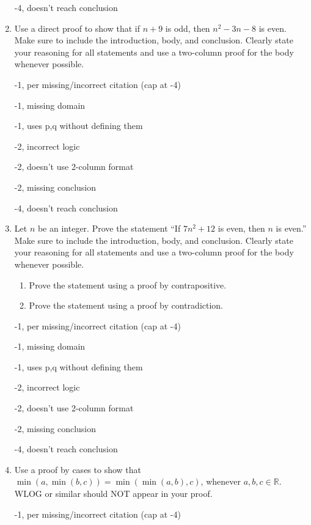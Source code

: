 \begin{enumerate}
\begin{rubric}
-4, doesn't reach conclusion
\end{rubric}

\item Use a direct proof to show that if $n + 9$ is odd, then $n^2-3n-8$ is even. Make sure to include the introduction, body, and conclusion. Clearly state your reasoning for all statements and use a two-column proof for the body whenever possible. 

\begin{rubric}
-1, per missing/incorrect citation (cap at -4)

-1, missing domain

-1, uses p,q without defining them

-2, incorrect logic

-2, doesn't use 2-column format

-2, missing conclusion

-4, doesn't reach conclusion
\end{rubric}

\item Let $n$ be an integer. Prove the statement “If $7n^2 + 12$ is even, then $n$ is even.” Make sure to include the introduction, body, and conclusion. Clearly state your reasoning for all statements and use a two-column proof for the body whenever possible. 
\begin{enumerate}
    \item Prove the statement using a proof by contrapositive.
    \item Prove the statement using a proof by contradiction.
\end{enumerate}

\begin{rubric}
-1, per missing/incorrect citation (cap at -4)

-1, missing domain

-1, uses p,q without defining them

-2, incorrect logic

-2, doesn't use 2-column format

-2, missing conclusion

-4, doesn't reach conclusion
\end{rubric}

\item Use a proof by cases to show that $\min(a, \min(b,c)) = \min(\min(a,b),c)$, whenever $a,b,c \in \mathbb{R}$. WLOG or similar should NOT appear in your proof. 

\begin{rubric}
-1, per missing/incorrect citation (cap at -4)


\end{rubric}
\end{enumerate}
